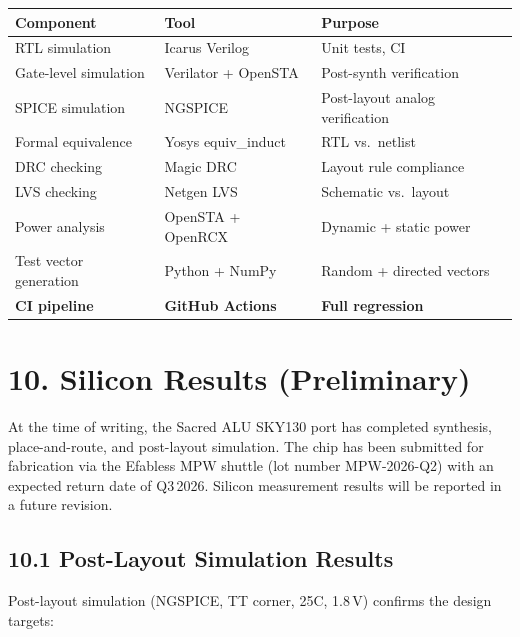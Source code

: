 \begin{longtable}[]{@{}
  >{\raggedright\arraybackslash}p{}
  >{\raggedright\arraybackslash}p{}
  >{\raggedright\arraybackslash}p{}@{}}
\toprule\noalign{}
Component & Tool & Purpose \\
\midrule\noalign{}
\endhead
\bottomrule\noalign{}
\endlastfoot
RTL simulation & Icarus Verilog & Unit tests, CI \\
Gate-level simulation & Verilator + OpenSTA & Post-synth verification \\
SPICE simulation & NGSPICE & Post-layout analog verification \\
Formal equivalence & Yosys equiv\_induct & RTL vs.\ netlist \\
DRC checking & Magic DRC & Layout rule compliance \\
LVS checking & Netgen LVS & Schematic vs.\ layout \\
Power analysis & OpenSTA + OpenRCX & Dynamic + static power \\
Test vector generation & Python + NumPy & Random + directed vectors \\
\hline
\textbf{CI pipeline} & \textbf{GitHub Actions} & \textbf{Full regression} \\
\end{longtable}

\section{10. Silicon Results (Preliminary)}\label{fa_72:silicon-results}

At the time of writing, the Sacred ALU SKY130 port has completed
synthesis, place-and-route, and post-layout simulation. The chip has
been submitted for fabrication via the Efabless MPW shuttle
(lot number MPW-2026-Q2) with an expected return date of Q3\,2026.
Silicon measurement results will be reported in a future revision.

\subsection{10.1 Post-Layout Simulation Results}

Post-layout simulation (NGSPICE, TT corner, 25\textdegree C, 1.8\,V)
confirms the design targets:

